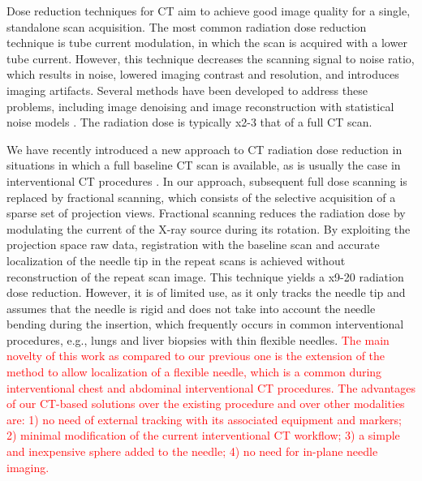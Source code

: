 Dose reduction techniques for CT aim to achieve good image quality for a single, standalone scan acquisition. The most common radiation dose reduction technique is tube current modulation, in which the scan is acquired with a lower tube current. However, this technique decreases the scanning signal to noise ratio, which results in noise, lowered imaging contrast and resolution, and introduces imaging artifacts. Several methods have been developed to address these problems, including image denoising \cite{manduca2009projection} and image reconstruction with statistical noise models  \cite{zhang2016statistical,kim2015sparseview,niu2014sparse,liu2014total}. The radiation dose is typically x2-3 that of a full CT scan. 

We have recently introduced a new approach to CT radiation dose reduction in situations in which a full baseline CT scan is available, as is usually the case in interventional CT procedures \cite{medan2017sparse, medan2017reduced}. In our approach, subsequent full dose scanning is replaced by fractional scanning, which consists of the selective acquisition of a sparse set of projection views. Fractional scanning reduces the radiation dose by modulating the current of the X-ray source during its rotation. By exploiting the projection space raw data, registration with the baseline scan and accurate localization of the needle tip in the repeat scans is achieved without reconstruction of the repeat scan  image. This technique yields a x9-20 radiation dose reduction. However, it is of limited use, as it only tracks the needle tip and assumes that the needle is rigid and does not take into account the needle bending during the insertion, which frequently occurs in common interventional procedures, e.g., lungs and liver biopsies with thin flexible needles. \textcolor{red}{The main novelty of this work as compared to our previous one \cite{medan2017reduced} is the extension of the method to allow localization of a flexible needle, which is a common during interventional chest and abdominal interventional CT procedures. The advantages of our CT-based solutions over the existing procedure and over other modalities are: 1) no need of external tracking with its associated equipment and markers; 2) minimal modification of the current interventional CT workflow; 3) a simple and inexpensive sphere added to the needle; 4) no need for in-plane needle imaging.}


